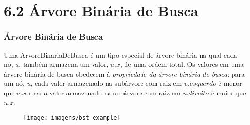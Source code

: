 \documentclass{beamer}
\begin{document}
\section{6.2 Árvore Binária de Busca}
\begin{frame}
\frametitle{Árvore Binária de Busca}
Uma ArvoreBinariaDeBusca é um tipo especial de árvore binária na qual cada nó, \ensuremath{\ensuremath{\ensuremath{\mathit{u}}}},
também armazena um valor, \ensuremath{\ensuremath{\ensuremath{\mathit{u}}.\ensuremath{\mathit{x}}}}, de uma ordem total.  Os valores em uma árvore binária de busca obedecem à \emph{propriedade da árvore binária de busca}:
%
para um nó, \ensuremath{\ensuremath{\ensuremath{\mathit{u}}}}, cada valor armazenado na subárvore com raiz em \ensuremath{\ensuremath{\ensuremath{\mathit{u}}.\ensuremath{\mathit{esquerdo}}}} é menor que \ensuremath{\ensuremath{\ensuremath{\mathit{u}}.\ensuremath{\mathit{x}}}} e cada valor armazenado na subárvore com raiz em
\ensuremath{\ensuremath{\ensuremath{\mathit{u}}.\ensuremath{\mathit{direito}}}} é maior que \ensuremath{\ensuremath{\ensuremath{\mathit{u}}.\ensuremath{\mathit{x}}}}.

\begin{figure}
  \begin{center}
    \texttt{[image: imagens/bst-example]}
  \end{center}
\end{figure}
\end{frame}
\end{document}
